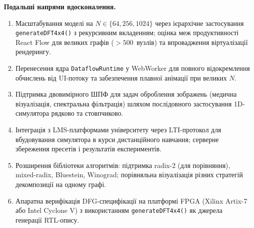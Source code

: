 \textbf{Подальші напрями вдосконалення.}

\begin{enumerate}
  \item Масштабування моделі на $N \in \{64, 256, 1024\}$ через ієрархічне
    застосування \texttt{generateDFT4x4()} з рекурсивним вкладенням;
    оцінка меж продуктивності React Flow для великих графів
    ($>500$~вузлів) та впровадження віртуалізації рендерингу.
  \item Перенесення ядра \texttt{DataflowRuntime} у WebWorker для повного
    відокремлення обчислень від UI-потоку та забезпечення плавної
    анімації при великих $N$.
  \item Підтримка двовимірного ШПФ для задач оброблення зображень
    (медична візуалізація, спектральна фільтрація) шляхом послідовного
    застосування 1D-симулятора рядково та стовпчиково.
  \item Інтеграція з LMS-платформами університету через LTI-протокол
    для вбудовування симулятора в курси дистанційного навчання;
    серверне збереження пресетів і результатів експериментів.
  \item Розширення бібліотеки алгоритмів: підтримка radix-2 (для
    порівняння), mixed-radix, Bluestein, Winograd; порівняльна
    візуалізація різних стратегій декомпозиції на одному графі.
  \item Апаратна верифікація DFG-специфікації на платформі FPGA
    (Xilinx Artix-7 або Intel Cyclone V) з використанням
    \texttt{generateDFT4x4()} як джерела генерації RTL-опису.
\end{enumerate}
